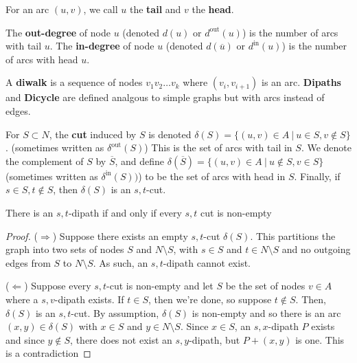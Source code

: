 \documentclass[../main.tex]{subfiles}
\begin{document}
\begin{definition}{}{}
  For an arc $(u,v)$, we call $u$ the \textbf{tail} and $v$ the \textbf{head}.

  The \textbf{out-degree} of node $u$ (denoted $d(u)$ or $d^{\text{out}}(u)$) is the number of arcs with tail $u$. The \textbf{in-degree} of node $u$ (denoted $d(\overline{u})$ or $d^{\text{in}}(u)$) is the number of arcs with head $u$.

  A \textbf{diwalk} is a sequence of nodes $v_1v_2\ldots v_k$ where $(v_i, v_{i+1})$ is an arc. \textbf{Dipaths} and \textbf{Dicycle} are defined analgous to simple graphs but with arcs instead of edges.

  For $S \subset N$, the \textbf{cut} induced by $S$ is denoted $\delta(S) = \{ (u,v) \in A \:\rvert\: u \in S, v \not\in S \}$. (sometimes written as $\delta^{\text{out}}(S)$) This is the set of arcs with tail in $S$.
  We denote the complement of $S$ by $\overline{S}$, and define $\delta(\overline{S}) = \{ (u,v) \in A \:\rvert\: u \not\in S, v \in S \}$ (sometimes written as $\delta^{\text{in}}(S))$) to be the set of arcs with head in $S$. Finally, if $s \in S, t \not\in S$, then $\delta(S)$ is an $s,t$-cut.
\end{definition}

\begin{theorem}{}{}
  There is an $s,t$-dipath if and only if every $s,t$ cut is non-empty
\end{theorem}
\begin{proof}
($\Rightarrow$) Suppose there exists an empty $s,t$-cut $\delta(S)$. This partitions the graph into two sets of nodes $S$ and $N\setminus S$, with $s \in S$ and $t \in N\setminus S$ and no outgoing edges from $S$ to $N\setminus S$. As such, an $s,t$-dipath cannot exist.

($\Leftarrow$) Suppose every $s,t$-cut is non-empty and let $S$ be the set of nodes $v \in A$ where a $s,v$-dipath exists. If $t \in S$, then we're done, so suppose $t \not\in S$. Then, $\delta(S)$ is an $s,t$-cut.
By assumption, $\delta(S)$ is non-empty and so there is an arc $(x,y) \in \delta(S)$ with $x \in S$ and $y \in N\setminus S$.
Since $x \in S$, an $s,x$-dipath $P$ exists and since $y \not\in S$, there does not exist an $s,y$-dipath, but $P + (x,y)$ is one. This is a contradiction
\end{proof}
\end{document}
